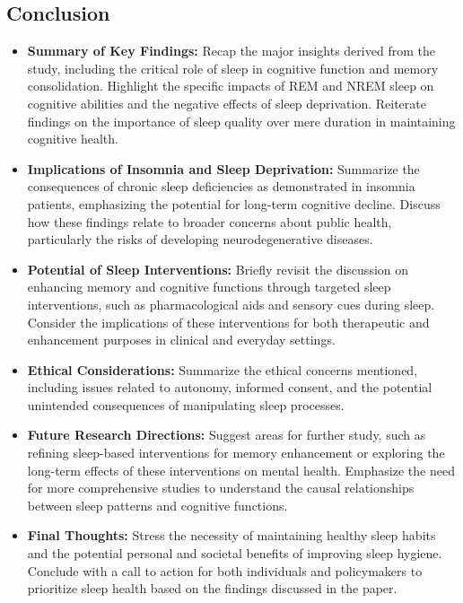 \subsection{Conclusion}
\begin{itemize}
    \item \textbf{Summary of Key Findings:} Recap the major insights derived from the study, including the critical role of sleep in cognitive function and memory consolidation. Highlight the specific impacts of REM and NREM sleep on cognitive abilities and the negative effects of sleep deprivation. Reiterate findings on the importance of sleep quality over mere duration in maintaining cognitive health.
    
    \item \textbf{Implications of Insomnia and Sleep Deprivation:} Summarize the consequences of chronic sleep deficiencies as demonstrated in insomnia patients, emphasizing the potential for long-term cognitive decline. Discuss how these findings relate to broader concerns about public health, particularly the risks of developing neurodegenerative diseases.
    
    \item \textbf{Potential of Sleep Interventions:} Briefly revisit the discussion on enhancing memory and cognitive functions through targeted sleep interventions, such as pharmacological aids and sensory cues during sleep. Consider the implications of these interventions for both therapeutic and enhancement purposes in clinical and everyday settings.
    
    \item \textbf{Ethical Considerations:} Summarize the ethical concerns mentioned, including issues related to autonomy, informed consent, and the potential unintended consequences of manipulating sleep processes.
    
    \item \textbf{Future Research Directions:} Suggest areas for further study, such as refining sleep-based interventions for memory enhancement or exploring the long-term effects of these interventions on mental health. Emphasize the need for more comprehensive studies to understand the causal relationships between sleep patterns and cognitive functions.
    
    \item \textbf{Final Thoughts:} Stress the necessity of maintaining healthy sleep habits and the potential personal and societal benefits of improving sleep hygiene. Conclude with a call to action for both individuals and policymakers to prioritize sleep health based on the findings discussed in the paper.
\end{itemize}
